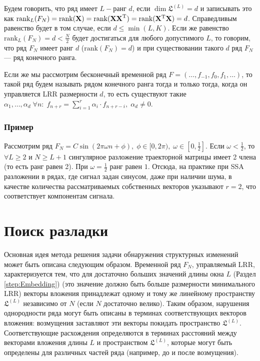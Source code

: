 \documentclass[specialist, substylefile = spbu.rtx,
			   subf, href, 12pt]{disser}
\begin{document}
Будем говорить, что ряд имеет $ L- $ранг $d$, если $\dim\mathfrak{L}^{(L)} = d$ и записывать это как $\textrm{rank}_L(F_N) = \textrm{rank}(\bold{X}) = \textrm{rank}(\bold{XX}^\mathrm{T}) = \textrm{rank}(\bold{X}^\mathrm{T}\bold{X}) = d$. Справедливым равенство будет в том случае, если $d\leq\min(L, K)$. Если же равенство $\textrm{rank}_L(F_N) = d < \frac{N}{2}$ будет достигаться для любого допустимого $L$, то говорим, что ряд $F_N$ имеет ранг $d$ ($\textrm{rank}(F_N) = d$) и при существовании такого $d$ ряд $F_N$ --- ряд конечного ранга.

Если же мы рассмотрим бесконечный временной ряд $F=(\dots, f_{-1}, f_0, f_1, \dots)$, то такой ряд будем называть рядом конечного ранга тогда и только тогда, когда он управляется LRR размерности $d$, то есть существуют такие $\alpha_1, \dots, \alpha_d \; \forall n: \; f_{n+r} = \sum\limits_{i=1}^{r} \alpha_i\cdot f_{n+r-i}, \; \alpha_d \neq 0$.

\subsection{Пример}

Рассмотрим ряд $F_N = C\sin(2\pi\omega n + \phi),\;\phi \in [0, 2\pi), \; \omega \in [0, \frac{1}{2}]$. Если $\omega < \frac{1}{2}$, то $\forall L\geq 2$ и $N\geq L+1$ сингулярное разложение траекторной матрицы имеет 2 члена (то есть ранг равен 2). При $\omega=\frac{1}{2}$ ранг равен $1$. Отсюда, на практике при SSA разложении в рядах, где сигнал задан синусом, даже при наличии шума, в качестве количества рассматриваемых собственных векторов указывают $r=2$, что соответствует компонентам сигнала.

\chapter{Поиск разладки} \label{sec:ch_2}
Основная идея метода решения задачи обнаружения структурных изменений может быть описана следующим образом. Временной ряд $F_N$, управляемый LRR, характеризуется тем, что для достаточно больших значений длины окна $L$ (Раздел \ref{step:Embedding}) (это значение должно быть больше размерности минимального LRR) векторы вложения принадлежат одному и тому же линейному пространству $\mathfrak{L}^{(L)}$ независимо от $N$ (если $N$ достаточно велико). Таким образом, нарушения однородности ряда могут быть описаны в терминах соответствующих векторов вложения: возмущения заставляют эти векторы покидать пространство $\mathfrak{L}^{(L)}$. Соответствующие расхождения определяются в терминах расстояний между векторами вложения длины $ L $ и пространством $\mathfrak{L}^{(L)}$, которые могут быть определены для различных частей ряда (например, до и после возмущения).
\end{document}
